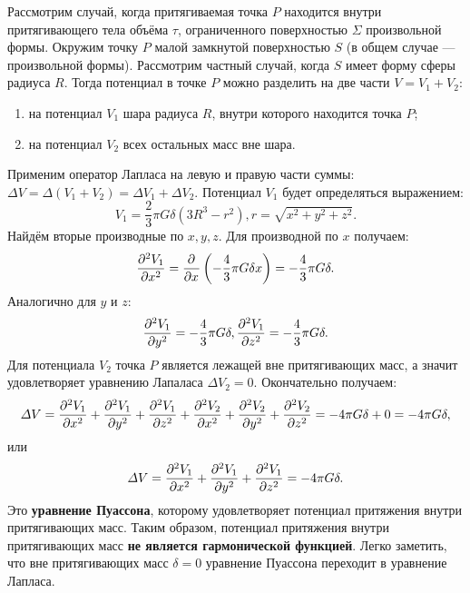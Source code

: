 \documentclass[11pt, a4paper]{article}
\theoremstyle{plain}
\theoremstyle{definition}
\theoremstyle{remark}
\begin{document}
Рассмотрим случай, когда притягиваемая точка $P$ находится внутри притягивающего тела объёма $\tau$, ограниченного поверхностью $\Sigma$ произвольной формы. Окружим точку $P$ малой замкнутой поверхностью $S$ (в общем случае --- произвольной формы). Рассмотрим частный случай, когда $S$ имеет форму сферы радиуса $R$. Тогда потенциал в точке $P$ можно разделить на две части $V = V_1 + V_2$:
\begin{enumerate}
	\item на потенциал $V_1$ шара радиуса $R$, внутри которого находится точка $P$;
	\item на потенциал $V_2$ всех остальных масс вне шара.
\end{enumerate}
Применим оператор Лапласа на левую и правую части суммы: $\Delta V = \Delta (V_1 + V_2) = \Delta V_1 + \Delta V_2$.
Потенциал $V_1$ будет определяться выражением:
\begin{equation*}
	V_1 = \dfrac{2}{3} \pi G \delta \left(3R^3 - r^2 \right), 
	r = \sqrt{x^2 + y^2 + z^2}.
\end{equation*}
Найдём вторые производные по $x, y, z$. Для производной по $x$ получаем:
\begin{equation*}
	\dpd[2]{V_1}{x} = \dpd{}{x} \left(- \dfrac{4}{3} \pi G \delta x \right) = - \dfrac{4}{3} \pi G \delta.
\end{equation*}
Аналогично для $y$ и $z$:
\begin{equation*}
	\dpd[2]{V_1}{y} = - \dfrac{4}{3} \pi G \delta,    
	\dpd[2]{V_1}{z} = - \dfrac{4}{3} \pi G \delta.
\end{equation*}
Для потенциала $V_2$ точка $P$ является лежащей вне притягивающих масс, а значит удовлетворяет уравнению Лапаласа $\Delta V_2 = 0$. Окончательно получаем:
\begin{equation*}
	\Delta V = \dpd[2]{V_1}{x} + \dpd[2]{V_1}{y} + \dpd[2]{V_1}{z} + \dpd[2]{V_2}{x} + \dpd[2]{V_2}{y} + \dpd[2]{V_2}{z} = -4 \pi G \delta + 0 = -4 \pi G \delta,
\end{equation*}
или
\begin{equation*}
	\Delta V = \dpd[2]{V_1}{x} + \dpd[2]{V_1}{y} + \dpd[2]{V_1}{z} = -4 \pi G \delta.
\end{equation*}
Это \textbf{уравнение Пуассона}, которому удовлетворяет потенциал притяжения внутри притягивающих масс. Таким образом, потенциал притяжения внутри притягивающих масс \textbf{не является гармонической функцией}. Легко заметить, что вне притягивающих масс $\delta = 0$ уравнение Пуассона переходит в уравнение Лапласа.
\end{document}

